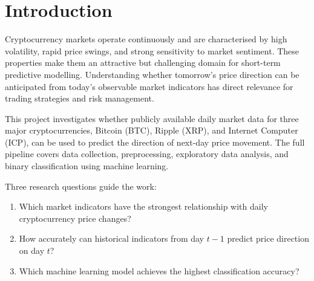 \section{Introduction}

Cryptocurrency markets operate continuously and are characterised by high volatility, rapid price swings,
and strong sensitivity to market sentiment.
These properties make them an attractive but challenging domain for short-term predictive modelling.
Understanding whether tomorrow's price direction can be anticipated from today's observable market
indicators has direct relevance for trading strategies and risk management.

This project investigates whether publicly available daily market data for three major cryptocurrencies,
Bitcoin (BTC), Ripple (XRP), and Internet Computer (ICP), can be used to predict the direction of
next-day price movement.
The full pipeline covers data collection, preprocessing, exploratory data analysis, and binary
classification using machine learning.

Three research questions guide the work:
\begin{enumerate}[leftmargin=1.5em,itemsep=0pt]
  \item Which market indicators have the strongest relationship with daily cryptocurrency price changes?
  \item How accurately can historical indicators from day $t-1$ predict price direction on day $t$?
  \item Which machine learning model achieves the highest classification accuracy?
\end{enumerate}
